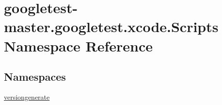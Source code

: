 \hypertarget{namespacegoogletest-master_1_1googletest_1_1xcode_1_1_scripts}{}\section{googletest-\/master.googletest.\+xcode.\+Scripts Namespace Reference}
\label{namespacegoogletest-master_1_1googletest_1_1xcode_1_1_scripts}
\subsection*{Namespaces}
\begin{DoxyCompactItemize}
\item 
 \mbox{\hyperlink{namespacegoogletest-master_1_1googletest_1_1xcode_1_1_scripts_1_1versiongenerate}{versiongenerate}}
\end{DoxyCompactItemize}
